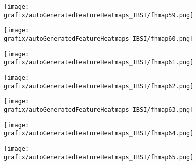 \begin{subfigure}{\wid\textwidth} 
    \centering 
    \caption{\tiny \sffamily {}} 
    \vspace{\vsp} 
    \texttt{[image: grafix/autoGeneratedFeatureHeatmaps\_IBSI/fhmap59.png]} 
\end{subfigure} 
\hspace{\hsp} 
\begin{subfigure}{\wid\textwidth} 
    \centering 
    \caption{\tiny \sffamily {}} 
    \vspace{\vsp} 
    \texttt{[image: grafix/autoGeneratedFeatureHeatmaps\_IBSI/fhmap60.png]} 
\end{subfigure} 
\hspace{\hsp} 
\begin{subfigure}{\wid\textwidth} 
    \centering 
    \caption{\tiny \sffamily {}} 
    \vspace{\vsp} 
    \texttt{[image: grafix/autoGeneratedFeatureHeatmaps\_IBSI/fhmap61.png]} 
\end{subfigure} 
\hspace{\hsp} 
\begin{subfigure}{\wid\textwidth} 
    \centering 
    \caption{\tiny \sffamily {}} 
    \vspace{\vsp} 
    \texttt{[image: grafix/autoGeneratedFeatureHeatmaps\_IBSI/fhmap62.png]} 
\end{subfigure} 
\hspace{\hsp} 
\begin{subfigure}{\wid\textwidth} 
    \centering 
    \caption{\tiny \sffamily {}} 
    \vspace{\vsp} 
    \texttt{[image: grafix/autoGeneratedFeatureHeatmaps\_IBSI/fhmap63.png]} 
\end{subfigure} 
\hspace{\hsp} 
\begin{subfigure}{\wid\textwidth} 
    \centering 
    \caption{\tiny \sffamily {}} 
    \vspace{\vsp} 
    \texttt{[image: grafix/autoGeneratedFeatureHeatmaps\_IBSI/fhmap64.png]} 
\end{subfigure} 
\hspace{\hsp} 
\begin{subfigure}{\wid\textwidth} 
    \centering 
    \caption{\tiny \sffamily {}} 
    \vspace{\vsp} 
    \texttt{[image: grafix/autoGeneratedFeatureHeatmaps\_IBSI/fhmap65.png]} 
\end{subfigure} 
